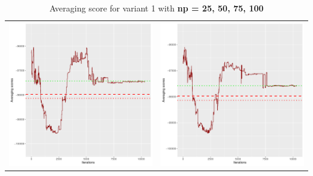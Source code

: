 \documentclass[]{scrartcl}
\begin{document}
\begin{table}[h!]
\begin{tabular}{cc}
\includegraphics[scale = 0.4]{./figs/hepar2/v1/75/avgBoundsEvolution-10352.pdf} & 
\includegraphics[scale = 0.4]{./figs/hepar2/v1/100/avgBoundsEvolution-10352.pdf} \\
\end{tabular}
\caption{Averaging score for variant 1 with \textbf{np =  25, 50, 75, 100}}
\end{table}
\end{document}
